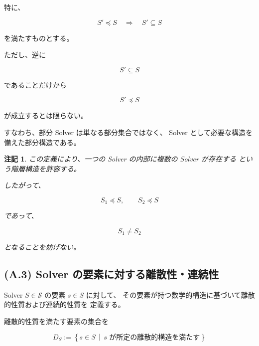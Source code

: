 \documentclass[a4paper,11pt]{article}
\newtheorem{remark}[definition]{注記}
\newcommand{\Solver}{\mathcal{S}}
\newcommand{\SubSolver}{\preceq}
\begin{document}
特に、

\begin{equation}
    S'\SubSolver S
    \quad\Longrightarrow\quad
    S'\subseteq S
    \label{eq:A-subsolver-subset}
\end{equation}

を満たすものとする。

ただし、逆に

\begin{equation}
    S'\subseteq S
\end{equation}

であることだけから

\begin{equation}
    S'\SubSolver S
\end{equation}

が成立するとは限らない。

すなわち、部分 Solver は単なる部分集合ではなく、
Solver として必要な構造を備えた部分構造である。

\begin{remark}
この定義により、一つの Solver の内部に複数の Solver が存在する
という階層構造を許容する。

したがって、

\begin{equation}
    S_1\SubSolver S,
    \qquad
    S_2\SubSolver S
\end{equation}

であって、

\begin{equation}
    S_1\neq S_2
\end{equation}

となることを妨げない。
\end{remark}


\subsection{(A.3) Solver の要素に対する離散性・連続性}
\label{subsec:A3}

Solver $S\in\Solver$ の要素 $s\in S$ に対して、
その要素が持つ数学的構造に基づいて離散的性質および連続的性質を
定義する。

離散的性質を満たす要素の集合を

\begin{equation}
    D_S
    :=
    \left\{
        s\in S
        \,\middle|\,
        s\text{ が所定の離散的構造を満たす}
    \right\}
    \label{eq:A-discrete-elements}
\end{equation}
\end{document}
